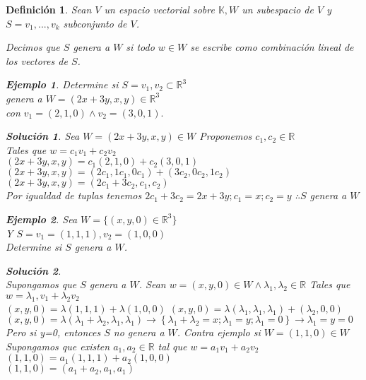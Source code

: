 \documentclass{IEEEtran}
\newcommand{\mb}[1]{\mathbb{#1}}
\newtheorem{defin}{Definici\'{o}n}
\newtheorem{solu}{Soluci\'{o}n}
\newtheorem{ejem}{Ejemplo}
\begin{document}
\begin{defin}

Sean $V$ un espacio vectorial sobre $\mb{K}, W$ un subespacio de $V$ y $S={v_1,...,v_k}$ subconjunto de $V$.

Decimos que $S$ genera a $W$ si todo $w\in W$ se escribe como combinaci\'{o}n lineal de los vectores de $S$.

\begin{ejem}

	Determine si $S={v_1, v_2}\subset \mb{R}^3$ \\
	genera a $W = {(2x+3y,x,y)\in \mb{R}^3}$ \\
	con $v_1 = (2,1,0) \land v_2=(3,0,1).$

\begin{solu}
	Sea $W=(2x+3y,x,y)\in W$
	Proponemos $c_1, c_2 \in \mb{R}$\\
	Tales que $w=c_1v_1+c_2v_2$\\
	$(2x+3y,x,y)=c_1(2,1,0)+c_2(3,0,1)$\\
	$(2x+3y,x,y)=(2c_1,1c_1,0c_1)+(3c_2,0c_2,1c_2)$\\
	$(2x+3y,x,y)=(2c_1+3c_2,c_1,c_2)$\\
	Por igualdad de tuplas tenemos $2c_1+3c_2=2x+3y;c_1 =x; c_2=y$
$\therefore S$ genera a $W$ 
\end{solu}
\end{ejem}

\begin{ejem}

	Sea $W=\{(x,y,0)\in \mb{R}^3\}$\\
	Y $S={v_1 =(1,1,1), v_2=(1,0,0)}$\\
	Determine si $S$ genera a $W$.
\begin{solu}\\
	Supongamos que $S$ genera a $W$.
	Sean $w=(x,y,0)\in W \land \lambda_1, \lambda_2 \in \mb{R}$
	Tales que $w = \lambda_1, v_1+ \lambda_2v_2 $\\
	$(x,y,0)=\lambda(1,1,1)+\lambda(1,0,0)$
	$(x,y,0)=\lambda(\lambda_1,\lambda_1,\lambda_1)+(\lambda_2,0,0)$\\
	$(x,y,0)=\lambda(\lambda_1 +\lambda_2,\lambda_1,\lambda_1)\to \left \{ \lambda_1 + \lambda_2 = x ; \lambda_1 = y; \lambda_1 = 0 \right \} \to \lambda_1 = y = 0$\\
Pero si y=0, entonces $S$ no genera a $W$. 
Contra ejemplo si $W=(1,1,0)\in W$
Supongamos que existen $a_1, a_2 \in \mb{R} $ tal que  $w=a_1v_1 + a_2v_2$\\
$(1,1,0)=a_1(1,1,1)+a_2(1,0,0)$\\
$(1,1,0)=(a_1 + a_2, a_1, a_1)$\\
\end{solu}
\end{ejem}
\end{defin}
\end{document}
